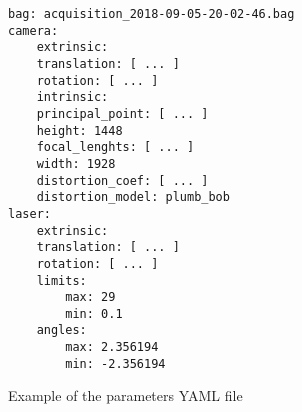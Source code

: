 \begin{figure}

    \begin{Verbatim}[frame=single, fontsize=\small]
bag: acquisition_2018-09-05-20-02-46.bag
camera:
    extrinsic:
    translation: [ ... ]
    rotation: [ ... ]
    intrinsic:
    principal_point: [ ... ]
    height: 1448
    focal_lenghts: [ ... ]
    width: 1928
    distortion_coef: [ ... ]
    distortion_model: plumb_bob
laser:
    extrinsic:
    translation: [ ... ]
    rotation: [ ... ]
    limits:
        max: 29
        min: 0.1
    angles:
        max: 2.356194
        min: -2.356194
    \end{Verbatim}

    \caption{Example of the parameters YAML file}

\end{figure}


